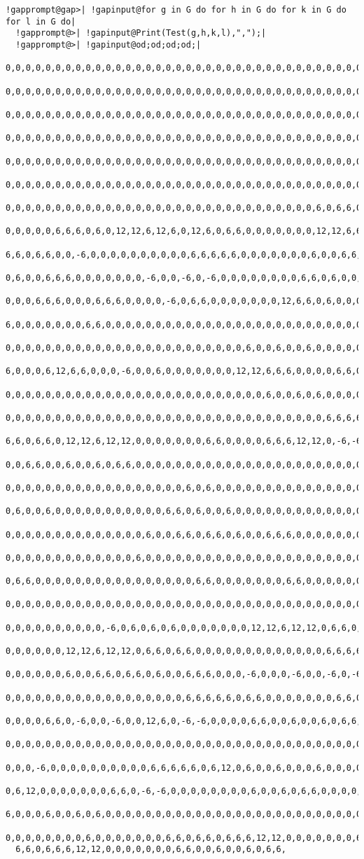 \documentclass[a4paper,11pt]{report}
\begin{document}
{{\begin{Verbatim}[commandchars=!@|,fontsize=\small,frame=single,label=Example]
  !gapprompt@gap>| !gapinput@for g in G do for h in G do for k in G do for l in G do|
  !gapprompt@>| !gapinput@Print(Test(g,h,k,l),",");|
  !gapprompt@>| !gapinput@od;od;od;od;|
  0,0,0,0,0,0,0,0,0,0,0,0,0,0,0,0,0,0,0,0,0,0,0,0,0,0,0,0,0,0,0,0,0,0,0,0,0,0,
  0,0,0,0,0,0,0,0,0,0,0,0,0,0,0,0,0,0,0,0,0,0,0,0,0,0,0,0,0,0,0,0,0,0,0,0,0,0,
  0,0,0,0,0,0,0,0,0,0,0,0,0,0,0,0,0,0,0,0,0,0,0,0,0,0,0,0,0,0,0,0,0,0,0,0,0,0,
  0,0,0,0,0,0,0,0,0,0,0,0,0,0,0,0,0,0,0,0,0,0,0,0,0,0,0,0,0,0,0,0,0,0,0,0,0,0,
  0,0,0,0,0,0,0,0,0,0,0,0,0,0,0,0,0,0,0,0,0,0,0,0,0,0,0,0,0,0,0,0,0,0,0,0,0,0,
  0,0,0,0,0,0,0,0,0,0,0,0,0,0,0,0,0,0,0,0,0,0,0,0,0,0,0,0,0,0,0,0,0,0,0,0,0,0,
  0,0,0,0,0,0,0,0,0,0,0,0,0,0,0,0,0,0,0,0,0,0,0,0,0,0,0,0,0,0,0,6,0,6,6,0,0,6,
  0,0,0,0,0,6,6,6,0,6,0,12,12,6,12,6,0,12,6,0,6,6,0,0,0,0,0,0,0,12,12,6,6,6,0,
  6,6,0,6,6,0,0,-6,0,0,0,0,0,0,0,0,0,0,6,6,6,6,6,0,0,0,0,0,0,0,6,0,0,6,6,0,6,6,
  0,6,0,0,6,6,6,0,0,0,0,0,0,0,-6,0,0,-6,0,-6,0,0,0,0,0,0,0,0,6,6,0,6,0,0,6,0,0,
  0,0,0,6,6,6,0,0,0,6,6,6,0,0,0,0,-6,0,6,6,0,0,0,0,0,0,0,12,6,6,0,6,0,0,0,0,12,
  6,0,0,0,0,0,0,0,6,6,0,0,0,0,0,0,0,0,0,0,0,0,0,0,0,0,0,0,0,0,0,0,0,0,0,0,0,0,
  0,0,0,0,0,0,0,0,0,0,0,0,0,0,0,0,0,0,0,0,0,0,0,0,6,0,0,6,0,0,6,0,0,0,0,0,6,6,
  6,0,0,0,6,12,6,6,0,0,0,-6,0,0,6,0,0,0,0,0,0,0,12,12,6,6,6,0,0,0,0,6,6,0,0,0,
  0,0,0,0,0,0,0,0,0,0,0,0,0,0,0,0,0,0,0,0,0,0,0,0,0,0,6,0,0,6,0,6,0,0,0,0,0,0,
  0,0,0,0,0,0,0,0,0,0,0,0,0,0,0,0,0,0,0,0,0,0,0,0,0,0,0,0,0,0,0,0,6,6,6,6,6,0,
  6,6,0,6,6,0,12,12,6,12,12,0,0,0,0,0,0,0,6,6,0,0,0,0,6,6,6,12,12,0,-6,-6,0,0,
  0,0,6,6,0,0,6,0,0,6,0,6,6,0,0,0,0,0,0,0,0,0,0,0,0,0,0,0,0,0,0,0,0,0,0,0,0,0,
  0,0,0,0,0,0,0,0,0,0,0,0,0,0,0,0,0,0,6,0,6,0,0,0,0,0,0,0,0,0,0,0,0,0,0,0,6,6,
  0,6,0,0,6,0,0,0,0,0,0,0,0,0,0,0,6,6,0,6,0,0,6,0,0,0,0,0,0,0,0,0,0,0,0,0,6,0,
  0,0,0,0,0,0,0,0,0,0,0,0,0,0,6,0,0,6,6,0,6,6,0,6,0,0,6,6,6,0,0,0,0,0,0,0,0,0,
  0,0,0,0,0,0,0,0,0,0,0,0,0,6,0,0,0,0,0,0,0,0,0,0,0,0,0,0,0,0,0,0,0,0,0,0,0,0,
  0,6,6,0,0,0,0,0,0,0,0,0,0,0,0,0,0,0,0,6,6,0,0,0,0,0,0,0,6,6,0,0,0,0,0,0,0,0,
  0,0,0,0,0,0,0,0,0,0,0,0,0,0,0,0,0,0,0,0,0,0,0,0,0,0,0,0,0,0,0,0,0,0,0,0,0,0,
  0,0,0,0,0,0,0,0,0,0,-6,0,6,0,6,0,6,0,0,0,0,0,0,0,12,12,6,12,12,0,6,6,0,6,6,0,
  0,0,0,0,0,0,12,12,6,12,12,0,6,6,0,6,6,0,0,0,0,0,0,0,0,0,0,0,0,0,6,6,6,6,6,0,
  0,0,0,0,0,0,6,0,0,6,6,0,6,6,0,6,0,0,6,6,6,0,0,0,-6,0,0,0,-6,0,0,-6,0,-6,0,0,
  0,0,0,0,0,0,0,0,0,0,0,0,0,0,0,0,0,0,6,6,6,6,6,0,6,6,0,0,0,0,0,0,0,6,6,0,0,0,
  0,0,0,0,6,6,0,-6,0,0,-6,0,0,12,6,0,-6,-6,0,0,0,0,6,6,0,0,6,0,0,6,0,6,6,0,0,0,
  0,0,0,0,0,0,0,0,0,0,0,0,0,0,0,0,0,0,0,0,0,0,0,0,0,0,0,0,0,0,0,0,0,0,0,0,0,0,
  0,0,0,-6,0,0,0,0,0,0,0,0,0,0,6,6,6,6,6,0,6,12,0,6,0,0,6,0,0,0,6,0,0,0,0,0,0,
  0,6,12,0,0,0,0,0,0,0,6,6,0,-6,-6,0,0,0,0,0,0,0,0,6,0,0,6,0,6,6,0,0,0,0,0,0,0,
  6,0,0,0,6,0,0,6,0,6,0,0,0,0,0,0,0,0,0,0,0,0,0,0,0,0,0,0,0,0,0,0,0,0,0,0,0,6,
  0,0,0,0,0,0,0,0,6,0,0,0,0,0,0,0,6,6,0,6,6,0,6,6,6,12,12,0,0,0,0,0,0,0,6,6,0,
  6,6,0,6,6,6,12,12,0,0,0,0,0,0,0,6,6,0,0,6,0,0,6,0,6,6,
  

\end{Verbatim}}}
\end{document}
